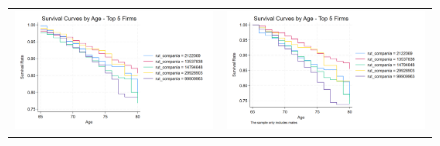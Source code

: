 \documentclass[12pt]{article}
\begin{document}
\begin{figure}[H]
\caption{}
\label{fig:ie4_15}
\centering{}%
\begin{tabular}{cc}
\includegraphics[scale=0.217]{../figures/IE4/IE4_km_curves_by_firm.png} 
& \includegraphics[scale=0.217]{../figures/IE4/IE4_km_curves_by_firm_males.png} 
\end{tabular}
\end{figure} 
 








\end{document}
